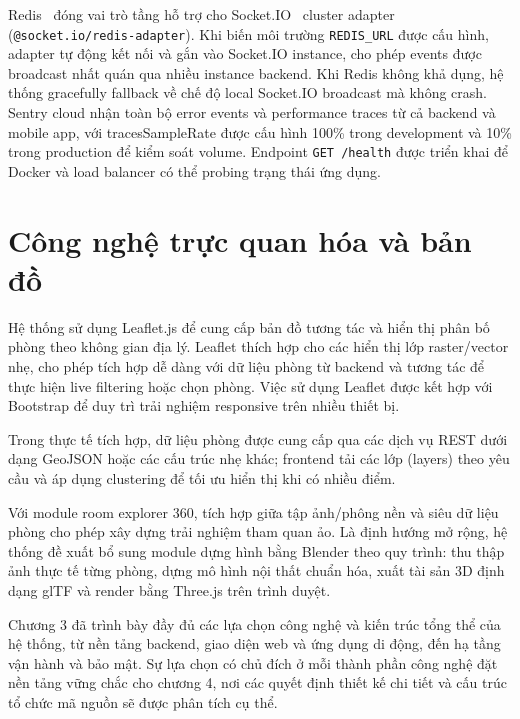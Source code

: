 ﻿\documentclass[a4paper,12pt,openany,oneside]{report}
\begin{document}
Redis~\cite{redis2024pubsub} đóng vai trò tầng hỗ trợ cho Socket.IO~\cite{socketio2024docs}
cluster adapter (\texttt{@socket.io/redis-adapter}). Khi biến môi trường
\texttt{REDIS\_URL} được cấu hình, adapter tự động kết nối và gắn vào Socket.IO
instance, cho phép events được broadcast nhất quán qua nhiều instance backend. Khi Redis không khả
dụng, hệ thống gracefully fallback về chế độ local Socket.IO broadcast mà không
crash. Sentry cloud nhận toàn bộ error events và performance traces từ cả
backend và mobile app, với tracesSampleRate được cấu hình 100\% trong
development và 10\% trong production để kiểm soát volume. Endpoint
\texttt{GET /health} được triển khai để Docker và load balancer có thể probing
trạng thái ứng dụng.

\section{Công nghệ trực quan hóa và bản đồ}

Hệ thống sử dụng Leaflet.js để cung cấp bản đồ tương tác và hiển thị phân bố
phòng theo không gian địa lý. Leaflet thích hợp cho các hiển thị lớp
raster/vector nhẹ, cho phép tích hợp dễ dàng với dữ liệu phòng từ backend và
tương tác để thực hiện live filtering hoặc chọn phòng. Việc sử dụng Leaflet
được kết hợp với Bootstrap để duy trì trải nghiệm responsive trên nhiều thiết
bị.

Trong thực tế tích hợp, dữ liệu phòng được cung cấp qua các dịch vụ REST dưới dạng GeoJSON hoặc các cấu trúc nhẹ khác; frontend tải các lớp (layers) theo yêu cầu và áp dụng clustering để tối ưu hiển thị khi có nhiều điểm.

Với module room explorer 360, tích hợp giữa tập ảnh/phông nền và siêu dữ liệu phòng cho phép xây dựng trải nghiệm tham quan ảo. Là định hướng mở rộng, hệ thống đề xuất bổ sung module dựng hình bằng Blender theo quy trình: thu thập ảnh thực tế từng phòng, dựng mô hình nội thất chuẩn hóa, xuất tài sản 3D định dạng glTF và render bằng Three.js trên trình duyệt.

Chương 3 đã trình bày đầy đủ các lựa chọn công nghệ và kiến trúc tổng thể của
hệ thống, từ nền tảng backend, giao diện web và ứng dụng di động, đến hạ tầng
vận hành và bảo mật. Sự lựa chọn có chủ đích ở mỗi thành phần công nghệ đặt
nền tảng vững chắc cho chương 4, nơi các quyết định thiết kế chi tiết và cấu
trúc tổ chức mã nguồn sẽ được phân tích cụ thể.

\clearpage
\end{document}
